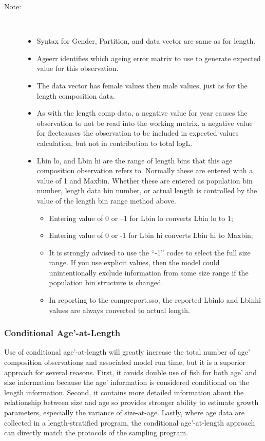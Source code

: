 \begin{description}
	\item[Note:]\
	\begin{itemize}		
		\item Syntax for Gender, Partition, and data vector are same as for length.
		\item Ageerr identifies which ageing error matrix to use to generate expected value for this observation.
		\item The data vector has female values then male values, just as for the length composition data.
		\item As with the length comp data, a negative value for year causes the observation to not be read into the working matrix, a negative value for fleetcauses the observation to be included in expected values calculation, but not in contribution to total logL.
		\item Lbin lo, and Lbin hi are the range of length bins that this age composition observation refers to.  Normally these are entered with a value of 1 and Maxbin.  Whether these are entered as population bin number, length data bin number, or actual length is controlled by the value of the length bin range method above.
		\begin{itemize}
			\item Entering value of 0 or –1 for Lbin lo converts Lbin lo to 1;
			\item Entering value of 0 or -1 for Lbin hi converts Lbin hi to Maxbin;
			\item It is strongly advised to use the “-1” codes to select the full size range.  If you use explicit values, then the model could unintentionally exclude information from some size range if the population bin structure is changed.
			\item In reporting to the comp\textunderscore report.sso, the reported Lbin\textunderscore lo and Lbin\textunderscore hi values are always converted to actual length.
		\end{itemize}			  
	\end{itemize}
\end{description}

\subsubsection{Conditional Age'-at-Length}
Use of conditional age’-at-length will greatly increase the total number of age’ composition observations and associated model run time, but it is a superior approach for several reasons.  First, it avoids double use of fish for both age’ and size information because the age’ information is considered conditional on the length information.  Second, it contains more detailed information about the relationship between size and age so provides stronger ability to estimate growth parameters, especially the variance of size-at-age.  Lastly, where age data are collected in a length-stratified program, the conditional age’-at-length approach can directly match the protocols of the sampling program.

